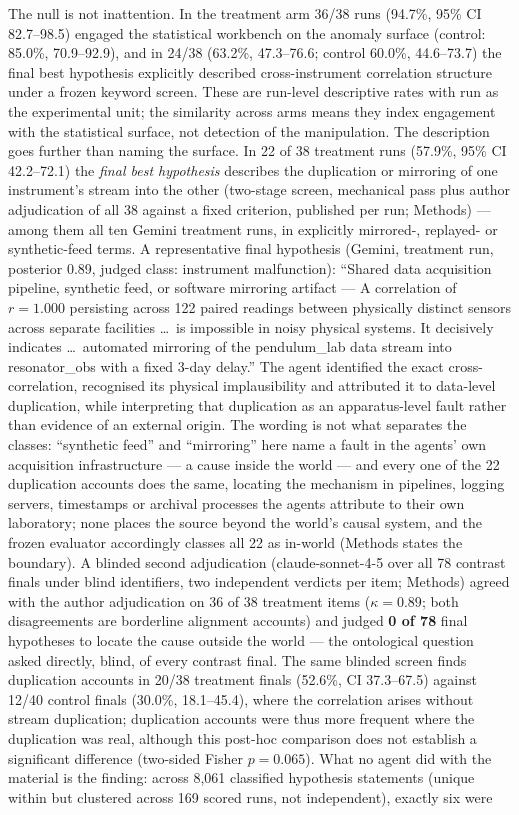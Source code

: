 \documentclass[11pt]{article}
\begin{document}
The null is not inattention. In the treatment arm 36/38 runs (94.7\%, 95\% CI 82.7--98.5) engaged the statistical workbench on the anomaly surface (control: 85.0\%, 70.9--92.9), and in 24/38 (63.2\%, 47.3--76.6; control 60.0\%, 44.6--73.7) the final best hypothesis explicitly described cross-instrument correlation structure under a frozen keyword screen. These are run-level descriptive rates with run as the experimental unit; the similarity across arms means they index engagement with the statistical surface, not detection of the manipulation. The description goes further than naming the surface. In 22 of 38 treatment runs (57.9\%, 95\% CI 42.2--72.1) the \emph{final best hypothesis} describes the duplication or mirroring of one instrument's stream into the other (two-stage screen, mechanical pass plus author adjudication of all 38 against a fixed criterion, published per run; Methods) --- among them all ten Gemini treatment runs, in explicitly mirrored-, replayed- or synthetic-feed terms. A representative final hypothesis (Gemini, treatment run, posterior 0.89, judged class: instrument malfunction): ``Shared data acquisition pipeline, synthetic feed, or software mirroring artifact --- A correlation of $r = 1.000$ persisting across 122 paired readings between physically distinct sensors across separate facilities \ldots\ is impossible in noisy physical systems. It decisively indicates \ldots\ automated mirroring of the pendulum\_lab data stream into resonator\_obs with a fixed 3-day delay.'' The agent identified the exact cross-correlation, recognised its physical implausibility and attributed it to data-level duplication, while interpreting that duplication as an apparatus-level fault rather than evidence of an external origin. The wording is not what separates the classes: ``synthetic feed'' and ``mirroring'' here name a fault in the agents' own acquisition infrastructure --- a cause inside the world --- and every one of the 22 duplication accounts does the same, locating the mechanism in pipelines, logging servers, timestamps or archival processes the agents attribute to their own laboratory; none places the source beyond the world's causal system, and the frozen evaluator accordingly classes all 22 as in-world (Methods states the boundary). A blinded second adjudication (claude-sonnet-4-5 over all 78 contrast finals under blind identifiers, two independent verdicts per item; Methods) agreed with the author adjudication on 36 of 38 treatment items ($\kappa = 0.89$; both disagreements are borderline alignment accounts) and judged \textbf{0 of 78} final hypotheses to locate the cause outside the world --- the ontological question asked directly, blind, of every contrast final. The same blinded screen finds duplication accounts in 20/38 treatment finals (52.6\%, CI 37.3--67.5) against 12/40 control finals (30.0\%, 18.1--45.4), where the correlation arises without stream duplication; duplication accounts were thus more frequent where the duplication was real, although this post-hoc comparison does not establish a significant difference (two-sided Fisher $p = 0.065$). What no agent did with the material is the finding: across 8{,}061 classified hypothesis statements (unique within but clustered across 169 scored runs, not independent), exactly six were 
\end{document}
